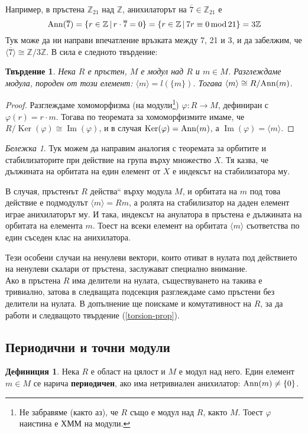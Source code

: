 \documentclass{article}
\newif\ifusemulticols
\newcommand\newterm[1]{\textbf{#1}}
\theoremstyle{definition}
\newtheorem{deff}{Дефиниция}
\theoremstyle{remark}
\newtheorem*{note}{Бележка}
\theoremstyle{plain}
\theoremstyle{plain}
\newtheorem{prop}[theorem]{Твърдение}
\newenvironment{mymulticols}
    { \ifusemulticols \begin{multicols}{2} \fi }
    { \ifusemulticols \end{multicols} \fi }
\DeclareMathOperator{\Ker}{Ker}
\DeclareMathOperator{\image}{Im}
\DeclareMathOperator{\Ann}{Ann}
\newcommand{\Z}{\mathbb{Z}}
\begin{document}
\begin{mymulticols}
Например, в пръстена $\Z_{21}$ над $\Z$, анихилаторът на $\overline 7 \in \Z_{21}$ е
$$\Ann(\overline 7) = \{ r\in \Z \,|\, r\cdot \overline 7=0\}=\{r\in\Z\,|\,7r\equiv 0 \,
\textnormal{mod}\,21\}=3\Z$$
Тук може да ни направи впечатление връзката между 7, 21 и 3, и да забелжим, че $\langle \overline 7
\rangle \cong \Z / 3 \Z$. В сила е следното твърдение:

\begin{prop}
    Нека $R$ е пръстен, $M$ е модул над $R$ и $m \in M$.
    Разглеждаме модула, породен от този елемент: $\langle m \rangle = l(\{m\})$.
    Тогава $\langle m \rangle \cong R/\textnormal{Ann}(m)$.
\end{prop}
\begin{proof}
    Разглеждаме хомоморфизма (на модули\footnote{Не забравяме (както аз), че $R$ също е модул над
    $R$, както $M$.
    Тоест $\varphi$ наистина е ХММ на модули.}) $\varphi : R \to M$, дефиниран с $\varphi(r) = r\cdot m$.
    Тогава по теоремата за хомоморфизмите имаме, че $R / \Ker(\varphi) \cong \image(\varphi)$, и в
    случая $\Ker(\varphi) = \textnormal{Ann}(m)$, а $\image(\varphi)=\langle m \rangle$.
\end{proof}

\begin{note}
    Тук можем да направим аналогия с теоремата за орбитите и стабилизаторите при действие на група
    върху множество $X$.
    Тя казва, че дължината на орбитата на един елемент от $X$ е индексът на стабилизатора му.

    В случая, пръстенът $R$ \quotedblbase действа`` върху модула $M$, и орбитата на $m$ под това
    действие е подмодулът $\langle m \rangle = Rm$, а ролята на стабилизатор на даден елемент играе
    анихилаторът му.
    И така, индексът на анулатора в пръстена е дължината на орбитата на елемента $m$.
    Тоест на всеки елемент на орбитата $\langle m \rangle$ съответства по един съседен клас на
    анихилатора.
\end{note}

Тези особени случаи на ненулеви вектори, които отиват в нулата под действието на ненулеви скалари от
пръстена, заслужават специално внимание.\\
Ако в пръстена $R$ има делители на нулата, съществуването на такива е тривиално, затова в следващата
подсекция разглеждаме само пръстени без делители на нулата.
В допълнение ще поискаме и комутативност на $R$, за да работи и следващото твърдение
(\ref{torsion-prop}).

\subsection{Периодични и точни модули}
\begin{deff}
    Нека $R$ е област на цялост и $M$ е модул над него.
    Един елемент $m \in M$ се нарича \newterm{периодичен}, ако има нетривиален анихилатор:
    $\textnormal{Ann}(m) \not= \{0\}$.


\end{deff}
\end{mymulticols}
\end{document}
